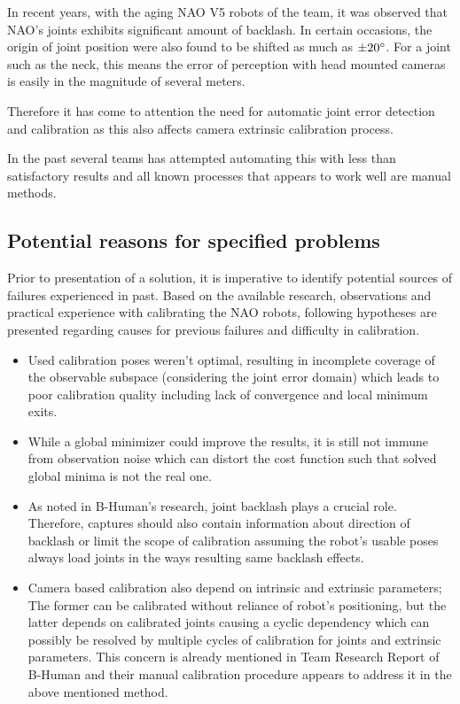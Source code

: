 \documentclass[english, printversion, nomenclature, notitle]{tuvisionthesis} %
\begin{document}
In recent years, with the aging NAO V5 robots of the team, it was observed that NAO's joints exhibits significant amount of backlash. In certain occasions, the origin of joint position were also found to be shifted as much as $\pm20\degree$. For a joint such as the neck, this means the error of perception with head mounted cameras is easily in the magnitude of several meters.

Therefore it has come to attention the need for automatic joint error detection and calibration as this also affects camera extrinsic calibration process.

In the past several teams has attempted automating this with less than satisfactory results and all known processes that appears to work well are manual methods. 

\subsection{Potential reasons for specified problems}
Prior to presentation of a solution, it is imperative to identify potential sources of failures experienced in past. Based on the available research, observations and practical experience with calibrating the NAO robots, following hypotheses are presented regarding causes for previous failures and difficulty in calibration.

\begin{itemize}
	\label{itemize:possible_reasons}
	\item Used calibration poses weren't optimal, resulting in incomplete coverage of the observable subspace (considering the joint error domain) which leads to poor calibration quality including lack of convergence and local minimum exits.
	\item While a global minimizer could improve the results, it is still not immune from observation noise which can distort the cost function such that solved global minima is not the real one.
	\item As noted in B-Human's research, joint backlash plays a crucial role. Therefore, captures should also contain information about direction of backlash or limit the scope of calibration assuming the robot's usable poses always load joints in the ways resulting same backlash effects.
	\item Camera based calibration also depend on intrinsic and extrinsic parameters; The former can be calibrated without reliance of robot's positioning, but the latter depends on calibrated joints causing a cyclic dependency which can possibly be resolved by multiple cycles of calibration for joints and extrinsic parameters. This concern is already mentioned in Team Research Report of B-Human and their manual calibration procedure appears to address it in the above mentioned method.
\end{itemize}
\end{document}
